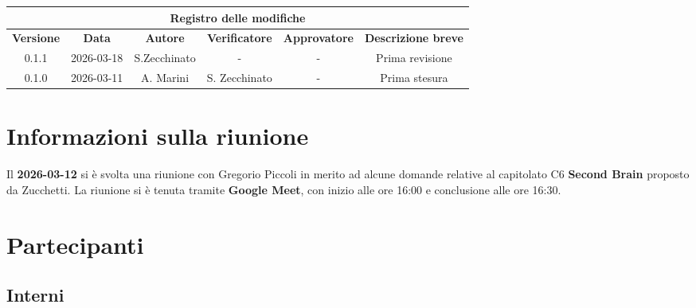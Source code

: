 \documentclass[a4paper, 10pt, colorlinks=true, linkcolor=black, urlcolor=blue, citecolor=blue, hidelinks]{article}
\begin{document}
\newcommand{\tipoverbale}{esterno}
\newcommand{\dataverbale}{2026-03-12}
\newcommand{\dataversione}{2026-03-18}
\newcommand{\versione}{0.1.1}
\newcommand{\stato}{Revisione}
\newcommand{\destinatari}{The Bitless, prof. T. Vardanega, prof. R. Cardin, Zucchetti}




\newpage

\begin{center}
    \thispagestyle{empty}
    \begin{tabular}{|c|c|c|c|c|c|}
                    \hline
                    \multicolumn{6}{|c|}{\textbf{Registro delle modifiche}} \\
                    \hline
                    \textbf{Versione} & \textbf{Data} & \textbf{Autore}  & \textbf{Verificatore} & \textbf{Approvatore} & \textbf{Descrizione breve} \\
                    \hline 
                    0.1.1 & \dataversione & S.Zecchinato & - & - & Prima revisione \\
                    \hline
                    0.1.0 & 2026-03-11 & A. Marini &  S. Zecchinato  & - & Prima stesura \\
                    \hline
                \end{tabular}
\end{center}

\newpage

\tableofcontents


\newpage
\section{Informazioni sulla riunione}
Il \textbf{2026-03-12} si è svolta una riunione con Gregorio Piccoli in merito ad alcune domande relative al capitolato C6 \textbf{Second Brain} proposto da Zucchetti. La riunione si è tenuta tramite \textbf{Google Meet}, con inizio alle ore 16:00 e conclusione alle ore 16:30.

\section{Partecipanti}

\subsection{Interni}
\end{document}
